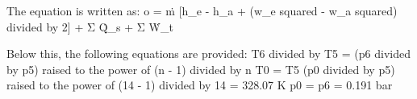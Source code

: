 The equation is written as:  
o = ṁ [h_e - h_a + (w_e squared - w_a squared) divided by 2] + Σ Q̇_s + Σ Ẇ_t  

Below this, the following equations are provided:  
T6 divided by T5 = (p6 divided by p5) raised to the power of (n - 1) divided by n  
T0 = T5 (p0 divided by p5) raised to the power of (14 - 1) divided by 14 = 328.07 K  
p0 = p6 = 0.191 bar